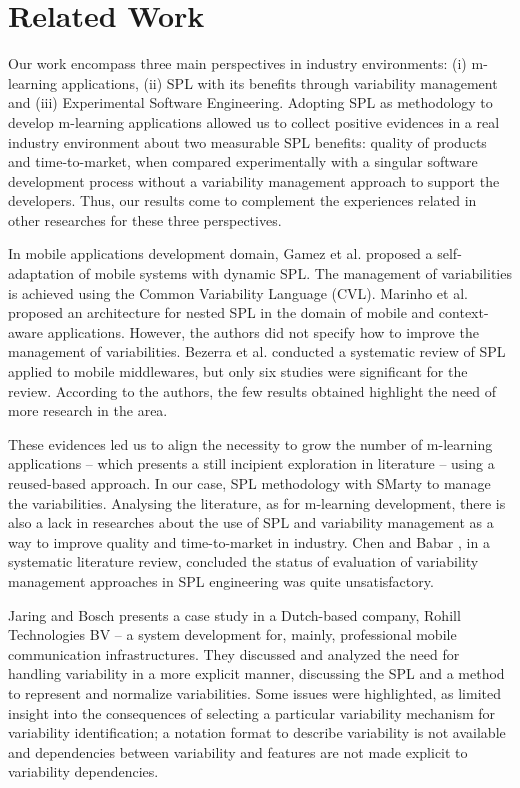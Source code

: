 \section{Related Work} \label{section6}

Our work encompass three main perspectives in industry environments: (i) m-learning applications, (ii) SPL with its benefits through variability management and (iii) Experimental Software Engineering. Adopting SPL as methodology to develop m-learning applications allowed us to collect positive evidences in a real industry environment about two measurable SPL benefits: quality of products and time-to-market, when compared experimentally with a singular software development process without a variability management approach to support the developers. Thus, our results come to complement the experiences related in other researches for these three perspectives.

In mobile applications development domain, Gamez et al. \cite{gamez14} proposed a self-adaptation of mobile systems with dynamic SPL. The management of variabilities is achieved using the Common Variability Language (CVL). Marinho et al. \cite{marinho10} proposed an architecture for nested SPL in the domain of mobile and context-aware applications. However, the authors did not specify how to improve the management of variabilities. Bezerra et al. \cite{bezerra09} conducted a systematic review of SPL applied to mobile middlewares, but only six studies were significant for the review. According to the authors, the few results obtained highlight the need of more research in the area. 

These evidences led us to align the necessity to grow the number of m-learning applications -- which presents a still incipient exploration in literature -- using a reused-based approach. In our case, SPL methodology with SMarty to manage the variabilities. Analysing the literature, as for m-learning development, there is also a lack in researches about the use of SPL and variability management as a way to improve quality and time-to-market in industry. Chen and Babar \cite{chen11}, in a systematic literature review, concluded the status of evaluation of variability management approaches in SPL engineering was quite unsatisfactory. 

Jaring and Bosch \cite{jaring02} presents a case study in a Dutch-based company, Rohill Technologies BV -- a system development for, mainly, professional mobile communication infrastructures. They discussed and analyzed the need for handling variability in a more explicit manner, discussing the SPL and a method to represent and normalize variabilities. Some issues were highlighted, as limited insight into the consequences of selecting a particular variability mechanism for variability identification; a notation format to describe variability is not available and dependencies between variability and features are not made explicit to variability dependencies.

